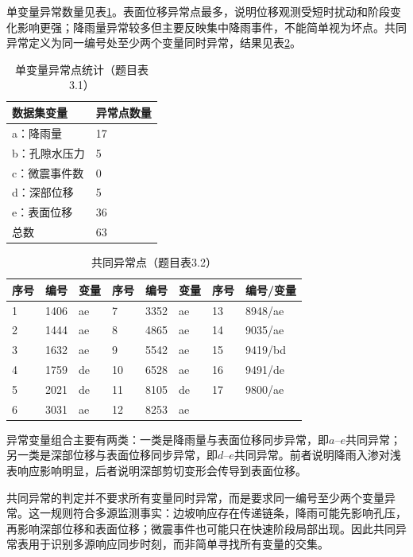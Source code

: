 单变量异常数量见表\ref{tab:q3_single_anomaly}。表面位移异常点最多，说明位移观测受短时扰动和阶段变化影响更强；降雨量异常较多但主要反映集中降雨事件，不能简单视为坏点。共同异常定义为同一编号处至少两个变量同时异常，结果见表\ref{tab:q3_common_anomaly}。

\begin{table}[htbp]
\centering
\small
\caption{单变量异常点统计（题目表3.1）}
\label{tab:q3_single_anomaly}
\begin{tabular}{ll}
\toprule
数据集变量 & 异常点数量 \\
\midrule
a：降雨量 & 17 \\
b：孔隙水压力 & 5 \\
c：微震事件数 & 0 \\
d：深部位移 & 5 \\
e：表面位移 & 36 \\
总数 & 63 \\
\bottomrule
\end{tabular}
\end{table}

\begin{table}[htbp]
\centering
\small
\caption{共同异常点（题目表3.2）}
\label{tab:q3_common_anomaly}
\begin{tabular}{llllllll}
\toprule
序号 & 编号 & 变量 & 序号 & 编号 & 变量 & 序号 & 编号/变量 \\
\midrule
1 & 1406 & ae & 7 & 3352 & ae & 13 & 8948/ae \\
2 & 1444 & ae & 8 & 4865 & ae & 14 & 9035/ae \\
3 & 1632 & ae & 9 & 5542 & ae & 15 & 9419/bd \\
4 & 1759 & de & 10 & 6528 & ae & 16 & 9491/de \\
5 & 2021 & de & 11 & 8105 & de & 17 & 9800/ae \\
6 & 3031 & ae & 12 & 8253 & ae &  &  \\
\bottomrule
\end{tabular}
\end{table}

异常变量组合主要有两类：一类是降雨量与表面位移同步异常，即$a$--$e$共同异常；另一类是深部位移与表面位移同步异常，即$d$--$e$共同异常。前者说明降雨入渗对浅表响应影响明显，后者说明深部剪切变形会传导到表面位移。

共同异常的判定并不要求所有变量同时异常，而是要求同一编号至少两个变量异常。这一规则符合多源监测事实：边坡响应存在传递链条，降雨可能先影响孔压，再影响深部位移和表面位移；微震事件也可能只在快速阶段局部出现。因此共同异常表用于识别多源响应同步时刻，而非简单寻找所有变量的交集。

